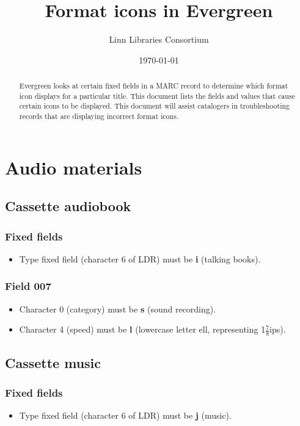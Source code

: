 \documentclass[a4paper,10pt]{amsart}
\title{Format icons in Evergreen}
\author{Linn Libraries Consortium}
\date{\today}
\let\stdsection\section
\renewcommand\section{\newpage\stdsection}
\begin{document}
\begin{abstract}
Evergreen looks at certain fixed fields in a MARC record to determine which format icon displays for a particular title.  This document lists the fields and values that cause certain icons to be displayed.  This document will assist catalogers in troubleshooting records that are displaying incorrect format icons.
\end{abstract}


\maketitle


\setcounter{tocdepth}{1}
\tableofcontents
\newpage


\section{Audio materials}
\subsection{Cassette audiobook}
\subsubsection*{Fixed fields}
\begin{itemize}
 \item Type fixed field (character 6 of LDR) must be {\bf i} (talking books).
\end{itemize}
\subsubsection*{Field 007}
\begin{itemize}
 \item Character 0 (category) must be {\bf s} (sound recording).
 \item Character 4 (speed) must be {\bf l} (lowercase letter ell, representing 1$\frac{7}{8}$ips).
\end{itemize}

\subsection{Cassette music}
\subsubsection*{Fixed fields}
\begin{itemize}
 \item Type fixed field (character 6 of LDR) must be {\bf j} (music).
\end{itemize}
\end{document}
